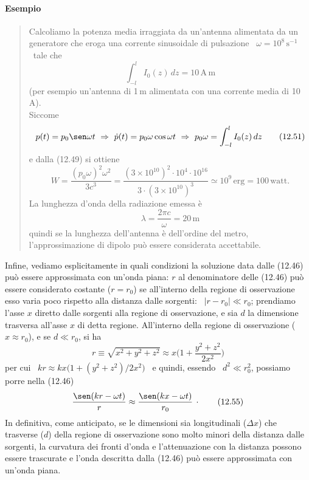 \paragraph{Esempio}
\begin{quote}
  Calcoliamo la potenza media irraggiata da un'antenna alimentata da un
  generatore che eroga una corrente sinusoidale di pulsazione
  \ $\omega=10^8\,\mathrm{s}^{-1}$ \ tale che
  \begin{equation}
    \int_{-l}^lI_0(z)\,dz=10\,\mathrm{A\,m}
    \tag{12.50}
  \end{equation}
  (per esempio un'antenna di 1\,m alimentata con una corrente media di 10\,A).\\
  Siccome
  \begin{equation}
    p(t)=p_0\sen\omega t\ \Rightarrow\ \dot p(t)=p_0\omega\cos\omega t
    \ \Rightarrow\ p_0\omega=\int_{-l}^lI_0(z)\,dz
    \tag{12.51}
  \end{equation}
  e dalla (12.49) si ottiene
  \begin{equation}
    W=\frac{(p_0\omega)^2\omega^2}{3c^3}
    =\frac{(3\times10^{10})^2\cdot10^4\cdot10^{16}}{3\cdot(3\times10^{10})^3}
    \simeq10^9\,\mathrm{erg}=100\,\mathrm{watt}.
    \tag{12.52}
  \end{equation}
  La lunghezza d'onda della radiazione emessa \`e
  \begin{equation}
    \lambda=\frac{2\pi c}{\omega}=20\,\mathrm{m}
    \tag{12.53}
  \end{equation}
  quindi se la lunghezza dell'antenna \`e dell'ordine del metro,
  l'approssimazione di dipolo pu\`o essere considerata accettabile.
\end{quote}

Infine, vediamo esplicitamente in quali condizioni la soluzione data dalle
(12.46) pu\`o essere approssimata con un'onda piana: $r$ al denominatore delle
(12.46) pu\`o essere considerato costante ($r=r_0$) se all'interno della regione
di osservazione esso varia poco rispetto alla distanza dalle sorgenti:
\ $|r-r_0|\ll r_0$; prendiamo l'asse $x$ diretto dalle sorgenti alla regione di
osservazione, e sia $d$ la dimensione trasversa all'asse $x$ di detta regione.
All'interno della regione di osservazione ($x\approx r_0$), e se $d\ll r_0$, si
ha
\begin{equation}
  r\equiv\sqrt{x^2+y^2+z^2}\approx x\Big(1+\frac{y^2+z^2}{2x^2}\Big)
  \tag{12.54}
\end{equation}
per cui \ $kr\approx kx\big(1+(y^2+z^2)/2x^2\big)$ \ e quindi, essendo
\ $d^2\ll r_0^2$, possiamo porre nella (12.46)
\begin{equation}
  \frac{\sen(kr-\omega t)}{r}\approx\frac{\sen(kx-\omega t)}{r_0}\,\cdot
  \tag{12.55}
\end{equation}
In definitiva, come anticipato, se le dimensioni sia longitudinali ($\Delta x$)
che trasverse ($d$) della regione di osservazione sono molto minori della
distanza dalle sorgenti, la curvatura dei fronti d'onda e l'attenuazione con la
distanza possono essere trascurate e l'onda descritta dalla (12.46) pu\`o essere
approssimata con un'onda piana.
